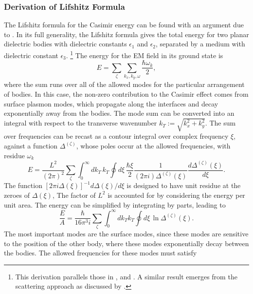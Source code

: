 \subsubsection{Derivation of Lifshitz Formula}
\label{sec:lifshitz}
The Lifshitz formula for the Casimir energy can be found with an argument due to \citet{vanKampen1968}.
In its full generality, the Lifshitz formula gives the total energy for two planar dielectric bodies with dielectric constants 
$\epsilon_1$ and $\epsilon_2$,
separated by a medium with dielectric constant $\epsilon_3$.  
\footnote{This derivation parallels those in \citet[\S~7.2]{Milonni1994}, and \citet[Ch.~12]{Bordag2009}.
A similar result emerges from the scattering approach as discussed by \citet{Lambrecht2011}.}
The energy for the EM field in its ground state is 
\begin{equation}
  E = \sum_{\zeta}\sum_{k_x,k_y,\omega} \frac{\hbar\omega_k}{2},
\end{equation}
where the sum runs over all of the allowed modes for the particular arrangement of bodies.  
In this case, the  non-zero contribution to the Casimir effect comes from surface plasmon modes, which propagate along the interfaces
and decay exponentially away from the bodies.  
The mode sum can be converted into an integral with respect to the transverse wavenumber $k_T:=\sqrt{k_x^2+k_y^2}$.
The sum over frequencies can be recast as a contour integral over complex frequency $\xi$, against a function $\Delta^{(\zeta)}$,
 whose poles occur at the allowed frequencies, with residue $\omega_k$  
\begin{equation}
  E = \frac{L^2}{(2\pi)^2}\sum_{\zeta}\int_0^\infty dk_T\,k_T\oint d\xi\, 
  \frac{\hbar \xi}{2} \frac{1}{(2\pi i)\Delta^{(\zeta)}(\xi)}\frac{d\Delta^{(\zeta)}(\xi)}{d\xi}.
\end{equation}
The function $[2\pi i\Delta(\xi)]^{-1}d\Delta(\xi)/d\xi$ is designed to have unit residue at the zeroes of $\Delta(\xi)$, 
The factor of $L^2$ is accounted for by considering the energy per unit area.  
The energy can be simplified by integrating by parts, leading to 
\begin{equation}
  \frac{E}{A} = \frac{\hbar}{16\pi^3 i}\sum_{\zeta}\int_0^\infty dk_Tk_T\oint d\xi \, \ln\Delta^{(\zeta)}(\xi).
  \label{eq:lifshitz_logDelta}
\end{equation}
The most important modes are the surface modes, since these modes are sensitive to the position of the other body, where
these modes exponentially decay between the bodies.
The allowed frequencies for these modes must satisfy 
